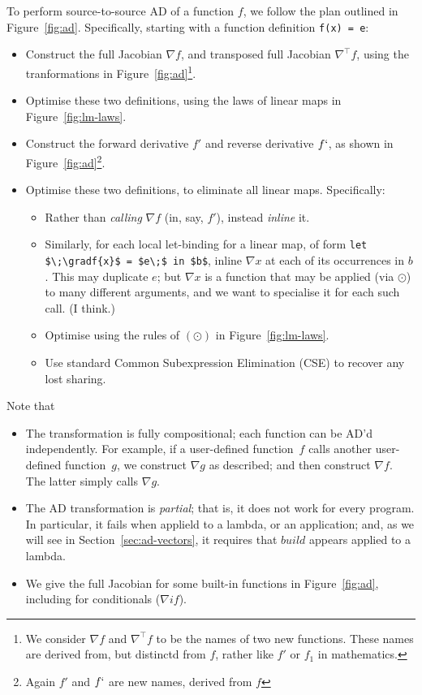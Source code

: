 \documentclass[sigplan,review]{acmart}
\newcommand{\gradf}[1]{\nabla\! \mathit{#1}}  %
\newcommand{\gradft}[1]{\nabla^{\top}\!\mathit{#1}}  %
\newcommand{\fwdDf}[1]{f'}  %
\newcommand{\revDf}[1]{f`}  %
\newcommand{\iffun}{\mathit{if}}
\newcommand{\buildfun}{\mathit{build}}
\newcommand{\lmapply}{\odot}   %
\newcommand{\lmcomp}{\,\circ\,}   %
\begin{document}
To perform source-to-source AD of a function $f$, we follow the plan
outlined in Figure~\ref{fig:ad}.  Specifically, starting with a
function definition \lstinline|f(x) = e|:

\begin{itemize}
\item Construct the full Jacobian $\gradf{f}$, and transposed full Jacobian $\gradft{f}$,
  using the tranformations in Figure~\ref{fig:ad}\footnote{
    We consider $\gradf{f}$ and $\gradft{f}$ to be the names of two new functions.
    These names are derived from, but distinctd from $f$, rather like $f'$ or $f_1$ in mathematics.
}.
\item Optimise these two definitions, using the laws of linear maps
  in Figure~\ref{fig:lm-laws}.
\item Construct the forward derivative $\fwdDf{f}$ and reverse derivative $\revDf{f}$,
  as shown in Figure~\ref{fig:ad}\footnote{Again $\fwdDf{f}$ and $\revDf{f}$ are new names, derived from $f$}.
\item Optimise these two definitions, to eliminate all linear maps. Specifically:
  \begin{itemize}
    \item Rather than \emph{calling} $\gradf{f}$ (in, say, $\fwdDf{f}$), instead \emph{inline} it.
    \item Similarly, for each local let-binding for a linear map, of form \lstinline|let $\;\gradf{x}$ = $e\;$ in $b$|,
      inline $\gradf{x}$ at each of its occurrences in $b$. This may duplicate $e$; but $\gradf{x}$ is a function
      that may be applied (via $\lmapply$) to many different arguments, and we want to specialise it for each
      such call.  (I think.)
    \item Optimise using the rules of $(\lmapply)$ in Figure~\ref{fig:lm-laws}.
    \item Use standard Common Subexpression Elimination (CSE) to recover any lost sharing.
  \end{itemize}
\end{itemize}

Note that
\begin{itemize}
\item The transformation is fully compositional; each function can be AD'd independently.
  For example, if a user-defined
  function~$f$ calls another user-defined function~$g$, we construct $\gradf{g}$ as
  described; and then construct $\gradf{f}$. The latter simply calls $\gradf{g}$.

\item The AD transformation is \emph{partial}; that is, it does not work for every
  program. In particular, it fails when applield to a lambda, or an application; and,
  as we will see in Section~\ref{sec:ad-vectors}, it requires that $\buildfun$ appears
  applied to a lambda.

\item We give the full Jacobian for some built-in functions in Figure~\ref{fig:ad}, including
  for conditionals ($\gradf{\iffun}$).
\end{itemize}
\end{document}

